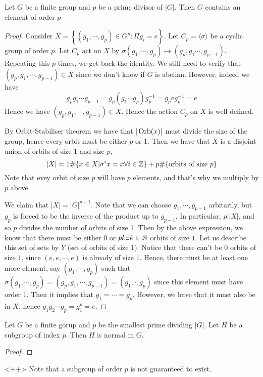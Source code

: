 \begin{theorem}
  Let $G$ be a finite group and $p$ be a prime divisor of $|G|$. Then $G$ contains an
  element of order $p$
  \label{thm:cauchy}
\end{theorem}
\begin{proof}
  Consider $X=\left\{ (g_1,\cdots,g_p) \in G^p : \Pi g_i =e\right\}$. Let $C_p =\langle
  \sigma \rangle$ be a cyclic group of order $p$. Let $C_p$ act on $X$ by $\sigma
  (g_1,\cdots,g_p)\mapsto (g_p,g_1\cdots, g_{p-1})$. Repeating this $p$ times, we get back
  the identity. We still need to verify that $(g_p,g_{1},\cdots, g_{p-1})\in X$ since we
  don't know if $G$ is abelian. However, indeed we have 
  \[g_p g_1 \cdots g_{p-1} = g_p(g_1\cdots g_p)g_p^{-1}= g_p e g_p^{-1}=e\]
  Hence we have $(g_{p}, g_{1}, \cdots, g_{p-1})\in X$. Hence the action $C_p$ on $X$ is
  well defined.

  By Orbit-Stabiliser theorem we have that $|\operatorname*{Orb}(x)|$ must divide the size of the group,
  hence every orbit must be either $p$ or $1$. Then we have that $X$ is a disjoint union of orbits
  of size $1$ and size $p$,
  \[|X|= 1\#\{x\in X | \sigma^i x=x \forall i\in\mathbb Z\} + p \#\{\text{orbits of size $p$}\}\]
  Note that evey orbit of size $p$ will have $p$ elements, and that's why we multiply by
  $p$ above.

  We claim that $|X|=|G|^{p-1}$. Note that we can choose
  $g_1,\cdots,g_{p-1}$ arbitarily, but $g_p$ is forced to be the inverse of the product up
  to $g_{p-1}$. In particular, $p\Big | |X|$, and so $p$ divides the number of orbits of
  size 1.  Then by the above expression, we know that there must be either $0$ or
  $pk\exists k\in\mathbb N$ orbits of size $1$. Let us describe this set of sets by $Y$ (set of
  orbits of size 1).  Notice that there can't be $0$ orbits of size $1$, since
  $(e,e,\cdots, e)$ is already of size $1$.
  Hence, there must be at least one more element, say $(g_1,\cdots, g_p)$ such that
  $\sigma (g_1,\cdots,g_p)= (g_p, g_1, \cdots, g_{p-1})= (g_1,\cdot,g_p)$ since this
  element must have order $1$. Then it implies that $g_1=\cdots=g_p$. However, we have
  that it must also be in $X$, hence $g_1g_2\cdots g_p=g_1^p=e$.
\end{proof}

\begin{theorem}
  Let $G$ be a finite gorup and $p$ be the smallest prime dividing $|G|$. Let $H$ be a
  subgroup of index $p$. Then $H$ is normal in $G$.
  \label{thm:cauchyGeneral}
\end{theorem}
\begin{proof}
\end{proof}<++>
Note that a subgroup of order $p$ is not guaranteed to exist.
